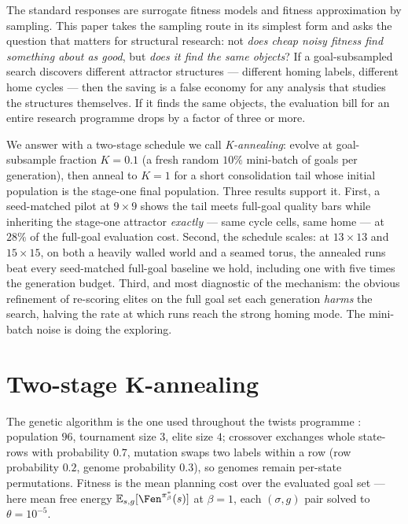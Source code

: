 \documentclass[a4paper, notitlepage, 11pt]{article}
\begin{document}
The standard responses are surrogate fitness models and fitness
approximation by sampling.  This paper takes the sampling route in its
simplest form and asks the question that matters for structural research:
not \emph{does cheap noisy fitness find something about as good}, but
\emph{does it find the same objects}?  If a goal-subsampled search
discovers different attractor structures --- different homing labels,
different home cycles --- then the saving is a false economy for any
analysis that studies the structures themselves.  If it finds the same
objects, the evaluation bill for an entire research programme drops by a
factor of three or more.

We answer with a two-stage schedule we call \emph{K-annealing}: evolve at
goal-subsample fraction $K = 0.1$ (a fresh random $10\%$ mini-batch of
goals per generation), then anneal to $K = 1$ for a short consolidation
tail whose initial population is the stage-one final population.  Three
results support it.  First, a seed-matched pilot at $9 \times 9$ shows the
tail meets full-goal quality bars while inheriting the stage-one attractor
\emph{exactly} --- same cycle cells, same home --- at $28\%$ of the
full-goal evaluation cost.  Second, the schedule scales: at $13 \times 13$
and $15 \times 15$, on both a heavily walled world and a seamed torus, the
annealed runs beat every seed-matched full-goal baseline we hold,
including one with five times the generation budget.  Third, and most
diagnostic of the mechanism: the obvious refinement of re-scoring elites
on the full goal set each generation \emph{harms} the search, halving the
rate at which runs reach the strong homing mode.  The mini-batch noise is
doing the exploring.

\section{Two-stage K-annealing}
\label{sec:method}

The genetic algorithm is the one used throughout the twists programme
\citep{Archer2026-relabelled-actions}: population $96$, tournament size
$3$, elite size $4$; crossover exchanges whole state-rows with probability
$0.7$, mutation swaps two labels within a row (row probability $0.2$,
genome probability $0.3$), so genomes remain per-state permutations.
Fitness is the mean planning cost over the evaluated goal set --- here
mean free energy $\mathbb{E}_{s,g}[\Fen^{\pi^*_\beta}(s)]$ at $\beta = 1$,
each $(\sigma, g)$ pair solved to $\theta = 10^{-5}$.
\end{document}
